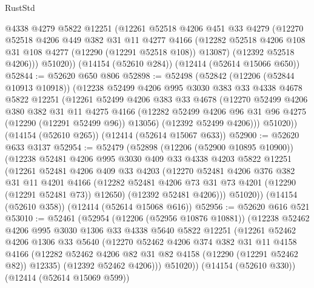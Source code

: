 \begin{lexlean}{RustStd}
\begin{coremodule}
        @4338
        @4279
        @5822
        @12251
        (@12261
          @52518
          @4206
          @451
          @33
          @4279
          (@12270
            @52518
            @4206
            @449
            @382
            @31
            @11
            @4277
            @4166
            (@12282 @52518 @4206 @108 @31 @108 @4277 (@12290 (@12291 @52518 @108)) @13087)
            (@12392 @52518 @4206)))
        @51020))
    (@14154 (@52610 @284))
    (@12414 (@52614 @15066 @650))
@52844 := @52620 @650 @806
@52898 := @52498
    (@52842
      (@12206 (@52844 @10913 @10918))
      (@12238
        @52499
        @4206
        @995
        @3030
        @383
        @33
        @4338
        @4678
        @5822
        @12251
        (@12261
          @52499
          @4206
          @383
          @33
          @4678
          (@12270
            @52499
            @4206
            @380
            @382
            @31
            @11
            @4275
            @4166
            (@12282 @52499 @4206 @96 @31 @96 @4275 (@12290 (@12291 @52499 @96)) @13056)
            (@12392 @52499 @4206)))
        @51020))
    (@14154 (@52610 @265))
    (@12414 (@52614 @15067 @633))
@52900 := @52620 @633 @3137
@52954 := @52479
    (@52898
      (@12206 (@52900 @10895 @10900))
      (@12238
        @52481
        @4206
        @995
        @3030
        @409
        @33
        @4338
        @4203
        @5822
        @12251
        (@12261
          @52481
          @4206
          @409
          @33
          @4203
          (@12270
            @52481
            @4206
            @376
            @382
            @31
            @11
            @4201
            @4166
            (@12282 @52481 @4206 @73 @31 @73 @4201 (@12290 (@12291 @52481 @73)) @12650)
            (@12392 @52481 @4206)))
        @51020))
    (@14154 (@52610 @358))
    (@12414 (@52614 @15068 @616))
@52956 := @52620 @616 @521
@53010 := @52461
    (@52954
      (@12206 (@52956 @10876 @10881))
      (@12238
        @52462
        @4206
        @995
        @3030
        @1306
        @33
        @4338
        @5640
        @5822
        @12251
        (@12261
          @52462
          @4206
          @1306
          @33
          @5640
          (@12270
            @52462
            @4206
            @374
            @382
            @31
            @11
            @4158
            @4166
            (@12282 @52462 @4206 @82 @31 @82 @4158 (@12290 (@12291 @52462 @82)) @12335)
            (@12392 @52462 @4206)))
        @51020))
    (@14154 (@52610 @330))
    (@12414 (@52614 @15069 @599))

\end{coremodule}
\end{lexlean}

